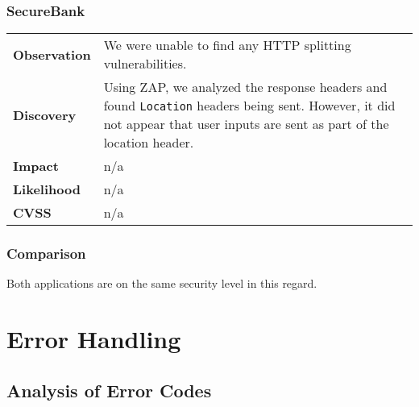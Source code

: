 \subsubsection*{SecureBank}

\begin{tabular}{l|p{10cm}}

\textbf{Observation} & We were unable to find any HTTP splitting vulnerabilities. \\
\textbf{Discovery} & Using ZAP, we analyzed the response headers and found \texttt{Location} headers being sent. However, it did not appear that user inputs are sent as part of the location header. \\
\textbf{Impact} & n/a \\
\textbf{Likelihood} & n/a \\
\textbf{CVSS} & n/a \\
\end{tabular}

\subsubsection*{Comparison}
Both applications are on the same security level in this regard.

\clearpage



\section{Error Handling}

\subsection{Analysis of Error Codes}
